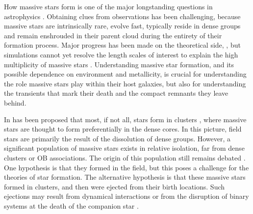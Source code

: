 \documentclass[a4paper,fleqn,usenatbib]{mnras}
\newcommand{\todo}[1]{{\large $\blacksquare$~\textbf{\color{red}[#1]}}~$\blacksquare$}
\begin{document}
How massive stars form is one of the major longstanding questions in astrophysics
\citep[e.g.,][]{zinnecker:07}. Obtaining clues from observations has been challenging, because massive stars are intrinsically rare, 
evolve fast, typically reside in dense groups and remain enshrouded in
their parent cloud during the entirety of their formation
process. Major progress has been made on the theoretical side,
\citep[e.g.][]{kuiper:15,rosen:16}, but simulations cannot yet resolve
the length scales  of interest to explain the 
high multiplicity of massive stars  \citep[e.g.,][]{bate:09, sana:17}. Understanding massive star formation, and its
possible dependence on environment and metallicity, is crucial for
understanding the role massive stars play within their host galaxies,
but also for understanding the transients that
mark their death and the compact remnants they leave behind. %

In has been proposed that most, if not all, stars form in clusters
\citep{lada:03}, where massive stars are thought to  form
preferentially in the dense cores. In this picture, field stars are primarily the result of the dissolution of dense groups. 
However, a significant population of massive stars exists in relative
isolation,  far from dense clusters or OB associations. The origin of
this population still remains debated \citep{gvaramadze:12, lamb:16,ward:18}.  One
hypothesis is that they  formed in the field, but this poses a
challenge for the theories of star formation. The alternative
hypothesis is that these massive stars formed in clusters, and then
were ejected from their birth locations. Such ejections may result
from dynamical interactions \citep[e.g.,][]{poveda:67} or from the
disruption of binary systems at the death of the companion %
star \citep[e.g.,][]{zwicky:57, blaauw:61, renzo:18}. 
 
\end{document}
